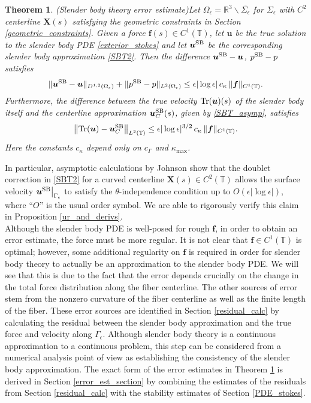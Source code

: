 \documentclass[11pt]{article}
\numberwithin{equation}{section}
\newcommand{\R}{\mathbb{R}}
\newcommand{\T}{\mathbb{T}}
\newcommand{\bu}{\bm{u}}
\newcommand{\X}{\bm{X}}
\newcommand{\ts}{\thinspace}
\newcommand{\SB}{{\rm SB}}
\newcommand{\abs}[1]{\left\lvert #1 \right\rvert}
\newcommand{\norm}[1]{\left\lVert #1 \right\rVert}
\newtheorem{theorem}{Theorem}[section]
\theoremstyle{definition}
\begin{document}
\begin{theorem}\emph{(Slender body theory error estimate)}\label{stokes_err_theorem} 
Let $\Omega_{\epsilon}= \R^3\backslash \overline{\Sigma_{\epsilon}}$ for $\Sigma_{\epsilon}$ with $C^2$ centerline $\X(s)$ satisfying the geometric constraints in Section \ref{geometric_constraints}. Given a force ${\bm f}(s)\in C^1(\T)$, let $\bu$ be the true solution to the slender body PDE \eqref{exterior_stokes} and let $\bu^{\SB}$ be the corresponding slender body approximation \eqref{SBT2}. Then the difference $\bu^{\SB}- \bu$, $p^{\SB}-p$ satisfies 
\begin{equation}\label{err_stokes_thm}
\|\bu^{\SB}-\bu\|_{D^{1,2}(\Omega_{\epsilon})}+ \|p^{\SB}-p\|_{L^2(\Omega_{\epsilon})} \le \epsilon|\log\epsilon| \ts c_{\kappa} \ts \|{\bm f}\|_{C^1(\T)}.
\end{equation}
Furthermore, the difference between the true velocity ${\rm Tr}(\bu)(s)$ of the slender body itself and the centerline approximation $\bu^{\SB}_C(s)$, given by \eqref{SBT_asymp}, satisfies 
\begin{equation}\label{center_err_thm}
\norm{{\rm Tr}(\bu) - \bu^{\SB}_C}_{L^2(\T)} \le \epsilon|\log\epsilon|^{3/2} \ts c_{\kappa} \ts \|{\bm f}\|_{C^1(\T)} .
\end{equation}
Here the constants $c_{\kappa}$ depend only on $c_{\Gamma}$ and $\kappa_{\max}$. 
\end{theorem}

In particular, asymptotic calculations by Johnson \cite{johnson1980improved} show that the doublet correction in \eqref{SBT2} for a curved centerline $\X(s)\in C^2(\T)$ allows the surface velocity $\bu^{\SB}\big|_{\Gamma_{\epsilon}}$ to satisfy the $\theta$-independence condition up to $O(\epsilon\abs{\log\epsilon})$, where ``$O$'' is the usual order symbol. We are able to rigorously verify this claim in Proposition \ref{ur_and_derivs}. \\

Although the slender body PDE is well-posed for rough ${\bm f}$, in order to obtain an error estimate, the force must be more regular. It is not clear that ${\bm f}\in C^1(\T)$ is optimal; however, some additional regularity on ${\bm f}$ is required in order for slender body theory to actually be an approximation to the slender body PDE. We will see that this is due to the fact that the error depends crucially on the change in the total force distribution along the fiber centerline. The other sources of error stem from the nonzero curvature of the fiber centerline as well as the finite length of the fiber. These error sources are identified in Section \ref{residual_calc} by calculating the residual between the slender body approximation and the true force and velocity along $\Gamma_{\epsilon}$. Although slender body theory is a continuous approximation to a continuous problem, this step can be considered from a numerical analysis point of view as establishing the consistency of the slender body approximation. The exact form of the error estimates in Theorem \ref{stokes_err_theorem} is derived in Section \ref{error_est_section} by combining the estimates of the residuals from Section \ref{residual_calc} with the stability estimates of Section \ref{PDE_stokes}. 
 
\end{document}
